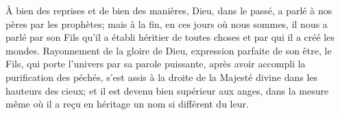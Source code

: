 À bien des reprises et de bien des manières,
	Dieu, dans le passé, a parlé à nos pères par les prophètes;
	mais à la fin, en ces jours où nous sommes, il nous a parlé par son Fils
	qu’il a établi héritier de toutes choses et par qui il a créé les mondes.
Rayonnement de la gloire de Dieu, expression parfaite de son être,
	le Fils, qui porte l’univers par sa parole puissante,
	après avoir accompli la purification des péchés,
	s’est assis à la droite de la Majesté divine dans les hauteurs des cieux;
	et il est devenu bien supérieur aux anges,
	dans la mesure même où il a reçu en héritage un nom si différent du leur.

